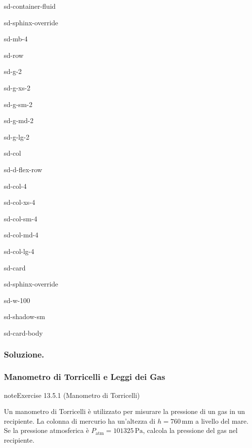 \documentclass[letterpaper,10pt,italian]{jupyterBook}
\begin{document}
\begin{sphinxuseclass}{sd-container-fluid}
\begin{sphinxuseclass}{sd-sphinx-override}
\begin{sphinxuseclass}{sd-mb-4}
\begin{sphinxuseclass}{sd-row}
\begin{sphinxuseclass}{sd-g-2}
\begin{sphinxuseclass}{sd-g-xs-2}
\begin{sphinxuseclass}{sd-g-sm-2}
\begin{sphinxuseclass}{sd-g-md-2}
\begin{sphinxuseclass}{sd-g-lg-2}
\begin{sphinxuseclass}{sd-col}
\begin{sphinxuseclass}{sd-d-flex-row}
\begin{sphinxuseclass}{sd-col-4}
\begin{sphinxuseclass}{sd-col-xs-4}
\begin{sphinxuseclass}{sd-col-sm-4}
\begin{sphinxuseclass}{sd-col-md-4}
\begin{sphinxuseclass}{sd-col-lg-4}
\begin{sphinxuseclass}{sd-card}
\begin{sphinxuseclass}{sd-sphinx-override}
\begin{sphinxuseclass}{sd-w-100}
\begin{sphinxuseclass}{sd-shadow-sm}
\begin{sphinxuseclass}{sd-card-body}
\end{sphinxuseclass}
\end{sphinxuseclass}
\end{sphinxuseclass}
\end{sphinxuseclass}
\end{sphinxuseclass}
\end{sphinxuseclass}
\end{sphinxuseclass}
\end{sphinxuseclass}
\end{sphinxuseclass}
\end{sphinxuseclass}
\end{sphinxuseclass}
\end{sphinxuseclass}
\end{sphinxuseclass}
\end{sphinxuseclass}
\end{sphinxuseclass}
\end{sphinxuseclass}
\end{sphinxuseclass}
\end{sphinxuseclass}
\end{sphinxuseclass}
\end{sphinxuseclass}
\end{sphinxuseclass}\subsubsection*{Soluzione.}


\subsubsection{Manometro di Torricelli e Leggi dei Gas}
\label{\detokenize{ch/thermodynamics/foundation-problems:manometro-di-torricelli-e-leggi-dei-gas}} \label{exercise:ch/thermodynamics/foundation-problems-exercise-0}

\begin{sphinxadmonition}{note}{Exercise 13.5.1 (Manometro di Torricelli)}



\sphinxAtStartPar
Un manometro di Torricelli è utilizzato per misurare la pressione di un gas in un recipiente. La colonna di mercurio ha un’altezza di \(h = 760 \, \text{mm}\) a livello del mare. Se la pressione atmosferica è \(P_\text{atm} = 101325 \, \text{Pa}\), calcola la pressione del gas nel recipiente.
\end{sphinxadmonition}
 \label{exercise:ch/thermodynamics/foundation-problems-exercise-1}
\end{document}
